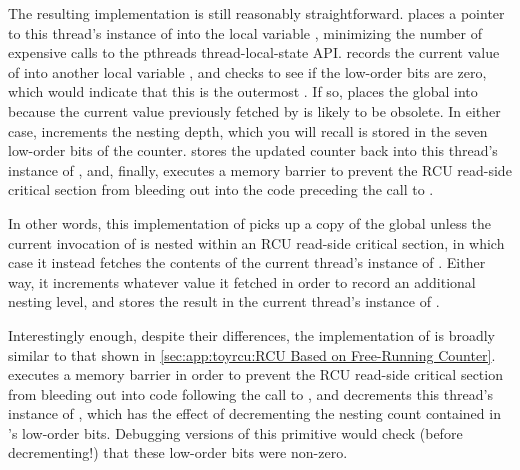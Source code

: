 \begin{fcvref}
The resulting  implementation is still reasonably
straightforward.
 places a pointer to
this thread's instance of 
into the local variable , minimizing the number of expensive
calls to the pthreads thread-local-state API\@.
 records the current value of 
into another local variable , and  checks
to see if the low-order bits are zero, which would indicate that
this is the outermost .
If so,  places the global 
into  because the current value previously fetched by
 is likely to be obsolete.
In either case,  increments the nesting depth,
which you will recall is stored in the seven low-order bits of the counter.
 stores the updated counter back into this thread's
instance of , and,
finally,  executes a memory barrier
to prevent the RCU read-side critical section from bleeding out
into the code preceding the call to .
\end{fcvref}

In other words, this implementation of  picks up a copy
of the global  unless the current invocation of
 is nested within an RCU read-side critical section,
in which case it instead fetches the contents of the current thread's
instance of .
Either way, it increments whatever value it fetched in order to record
an additional nesting level, and stores the result in the current
thread's instance of .

\begin{fcvref}
Interestingly enough, despite their  differences,
the implementation of 
is broadly similar to that shown in
\cref{sec:app:toyrcu:RCU Based on Free-Running Counter}.
 executes a memory barrier
in order to prevent the RCU read-side
critical section from bleeding out into code following the call
to , and
 decrements this thread's instance of ,
which has the effect of decrementing the nesting count contained in
's low-order bits.
Debugging versions of this primitive would check (before decrementing!)
that these low-order bits were non-zero.
\end{fcvref}

